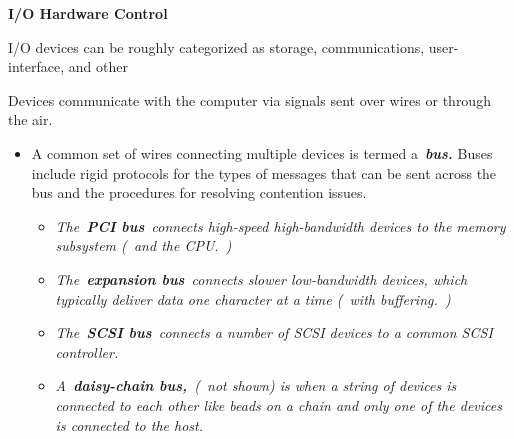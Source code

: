 \documentclass[12pt]{article}
\begin{document}
{\fontsize{20pt}{24.0pt}\selectfont \textbf{I/O Hardware Control}\par}\par

\begin{adjustwidth}{0.5in}{0.0in}
I/O devices can be roughly categorized as storage, communications, user-interface, and other\par

\end{adjustwidth}

\begin{adjustwidth}{0.5in}{0.0in}
Devices communicate with the computer via signals sent over wires or through the air.\par

\end{adjustwidth}

\begin{itemize}
	\item A common set of wires connecting multiple devices is termed a \textbf{\textit{bus. }}Buses include rigid protocols for the types of messages that can be sent across the bus and the procedures for resolving contention issues.\par

\begin{itemize}
	\item \textit{The \textbf{PCI bus} connects high-speed high-bandwidth devices to the memory subsystem ( and the CPU. )}\par

	\item \textit{The \textbf{expansion bus} connects slower low-bandwidth devices, which typically deliver data one character at a time ( with buffering. )}\par

	\item \textit{The \textbf{SCSI bus} connects a number of SCSI devices to a common SCSI controller.}\par

	\item \textit{A \textbf{daisy-chain bus,} ( not shown) is when a string of devices is connected to each other like beads on a chain and only one of the devices is connected to the host.}
\end{itemize}
\end{itemize}\par



\end{document}
